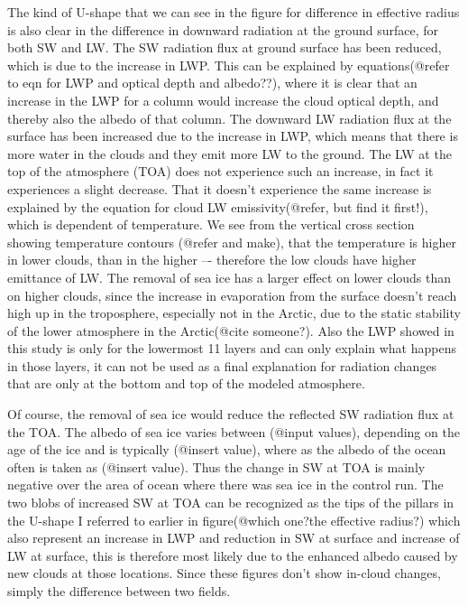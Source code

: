 The kind of U-shape that we can see in the figure for difference in effective radius is also clear in the difference in downward radiation at the ground surface, for both SW and LW. The SW radiation flux at ground surface has been reduced, which is due to the increase in LWP. This can be explained by equations(@refer to eqn for LWP and optical depth and albedo??), where it is clear that an increase in the LWP for a column would increase the cloud optical depth, and thereby also the albedo of that column. The downward LW radiation flux at the surface has been increased due to the increase in LWP, which means that there is more water in the clouds and they emit more LW to the ground. The LW at the top of the atmosphere (TOA) does not experience such an increase, in fact it experiences a slight decrease. That it doesn't experience the same increase is explained by the equation for cloud LW emissivity(@refer, but find it first!), which is dependent of temperature. We see from the vertical cross section showing temperature contours (@refer and make), that the temperature is higher in lower clouds, than in the higher %
–- therefore the low clouds have higher emittance of LW. The removal of sea ice has a larger effect on lower clouds than on higher clouds, since the increase in evaporation from the surface doesn't reach high up in the troposphere, especially not in the Arctic, due to the static stability of the lower atmosphere in the Arctic(@cite someone?). Also the LWP showed in this study is only for the lowermost 11 layers and can only explain what happens in those layers, it can not be used as a final explanation for radiation changes that are only at the bottom and top of the modeled atmosphere.

Of course, the removal of sea ice would reduce the reflected SW radiation flux at the TOA. The albedo of sea ice varies between (@input values), depending on the age of the ice and is typically (@insert value), where as the albedo of the ocean often is taken as (@insert value). Thus the change in SW at TOA is mainly negative over the area of ocean where there was sea ice in the control run. The two blobs of increased SW at TOA can be recognized as the tips of the pillars in the U-shape I referred to earlier in figure(@which one?the effective radius?) which also represent an increase in LWP and reduction in SW at surface and increase of LW at surface, this is therefore most likely due to the enhanced albedo caused by new clouds at those locations. Since these figures don't show in-cloud changes, simply the difference between two fields.

